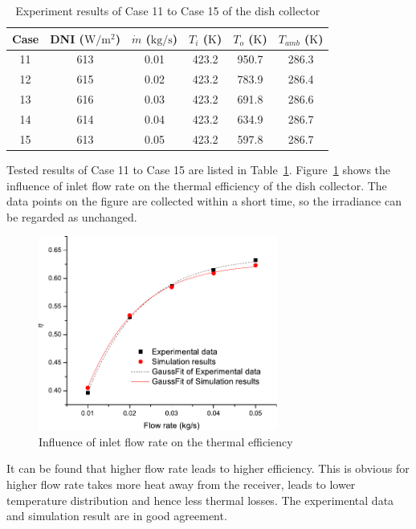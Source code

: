\begin{table}[htbp]\footnotesize
	\caption{Experiment results of Case 11 to Case 15 of the dish collector}
	\begin{center}
	\begin{tabular}{cccccc}
		\toprule
		Case	& DNI ($\mathrm{W/m^2}$)	&	$\dot{m}$ ($\mathrm{kg/s}$)			&	$T_i$ ($\mathrm{K}$)	&	$T_o$ ($\mathrm{K}$)		&	$T_{amb}$ ($\mathrm{K}$)\\
		\midrule
		11	&	613	&	0.01	&	423.2	&	950.7	&	286.3\\
		12	&	615	&	0.02	&	423.2	&	783.9	&	286.4\\
		13	&	616	&	0.03	&	423.2	&	691.8	&	286.6	\\
		14	&	614	&	0.04	&	423.2	&	634.9	&	286.7\\
		15	&	613	&	0.05	&	423.2	&	597.8	&	286.7\\
		\bottomrule
	\end{tabular}
	\end{center}
	\label{tab:ResultOfDish2}
\end{table}
Tested results of Case 11 to Case 15 are listed in Table~\ref{tab:ResultOfDish2}.
Figure~\ref{fig:q_m-eta-dish} shows the influence of inlet flow rate on the thermal efficiency of the dish collector. The data points on the figure are collected within a short time, so the irradiance can be regarded as unchanged.
\begin{figure}[!ht]
\centering
\includegraphics[width=0.7\textwidth]{fig/q_m-eta-dish}
\caption{Influence of inlet flow rate on the thermal efficiency}
\label{fig:q_m-eta-dish}
\end{figure}

It can be found that higher flow rate leads to higher efficiency. This is obvious for higher flow rate takes more heat away from the receiver, leads to lower temperature distribution and hence less thermal losses. The experimental data and simulation result are in good agreement.

